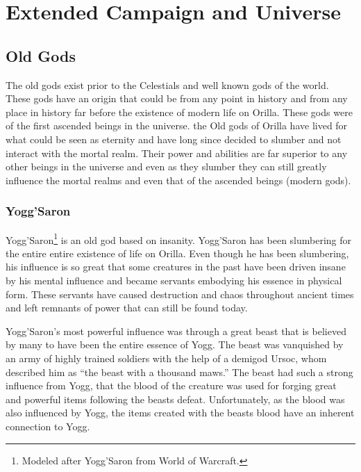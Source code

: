 \chapter{Extended Campaign and Universe}

\section{Old Gods}

The old gods exist prior to the Celestials and well known gods of the world. These gods have an origin that could be from any point in history and from any place in history far before the existence of modern life on Orilla. These gods were of the first ascended beings in the universe. the Old gods of Orilla have lived for what could be seen as eternity and have long since decided to slumber and not interact with the mortal realm. Their power and abilities are far superior to any other beings in the universe and even as they slumber they can still greatly influence the mortal realms and even that of the ascended beings (modern gods).

\subsection{Yogg'Saron}

Yogg'Saron\footnote{Modeled after Yogg'Saron from World of Warcraft.} is an old god based on insanity. Yogg'Saron has been slumbering for the entire entire existence of life on Orilla. Even though he has been slumbering, his influence is so great that some creatures in the past have been driven insane by his mental influence and became servants embodying his essence in physical form. These servants have caused destruction and chaos throughout ancient times and left remnants of power that can still be found today. 

Yogg'Saron's most powerful influence was through a great beast that is believed by many to have been the entire essence of Yogg. The beast was vanquished by an army of highly trained soldiers with the help of a demigod Ursoc, whom described him as ``the beast with a thousand maws.'' The beast had such a strong influence from Yogg, that the blood of the creature was used for forging great and powerful items following the beasts defeat. Unfortunately, as the blood was also influenced by Yogg, the items created with the beasts blood have an inherent connection to Yogg.

